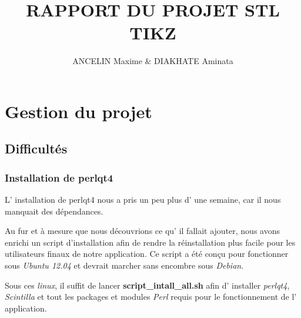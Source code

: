 \documentclass[a4paper]{report}
\title{RAPPORT DU PROJET STL \\ TIKZ}
\author{ANCELIN Maxime & DIAKHATE Aminata}
\begin{document}
 

\newenvironment{violetpar}{\color{violet}}{}
\newenvironment{bluepar}{\par\color{blue}}{\par}
\newenvironment{yellowpar}{\par\color{orange}}{\par}

\renewcommand{\labelitemi}{$\bullet$}

\setcounter{tocdepth}{3}

\tableofcontents
\newpage

\titleformat{\chapter}[hang]{\bf\huge}{\thechapter}{2pc}{} 

\chapter {Gestion du projet}
\section{Difficultés}
\subsection{Installation de perlqt4}
L' installation de perlqt4 nous a pris un peu plus d' une semaine,
car il nous manquait des dépendances.

Au fur et à mesure que nous découvrions ce qu' il fallait ajouter,
nous avons enrichi un script d'installation afin de rendre la réinstallation
plus facile pour les utilisateurs finaux de notre application. Ce
script a été conçu pour fonctionner sous \textit{Ubuntu 12.04} et devrait marcher
sans encombre sous \textit{Debian}.

Sous ces \textit{linux}, il suffit de lancer \textbf{script\_intall\_all.sh}
afin d' installer \textit{perlqt4}, \textit{Scintilla} et tout les packages et modules
\textit{Perl} requis pour le fonctionnement de l' application.
\end{document}

